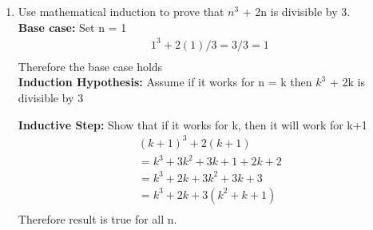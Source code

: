 \documentclass{article}
\begin{document}
\begin{enumerate}
\item Use mathematical induction to prove that $n^3$ + 2n is divisible by 3. \\
\textbf{Base case:} Set n = 1
\begin{align*}
1^3 + 2(1)/3 = 3/3 = 1 \\
\end{align*}
 Therefore the base case holds \\
 
 \textbf{Induction Hypothesis:} Assume if it works for n = k then $k^3$ + 2k is divisible by 3
 
 \textbf{Inductive Step:} Show that if it works for k, then it will work for k+1
 \begin{align*}
 (k+1)^3 + 2(k+1) \\
 = k^3+3k^2+3k+1+2k+2 \\
 = k^3+2k+3k^2+3k+3 \\
 = k^3+2k+3(k^2+k+1) \\
 \end{align*}
 Therefore result is true for all n.
 

\end{enumerate}
\end{document}
